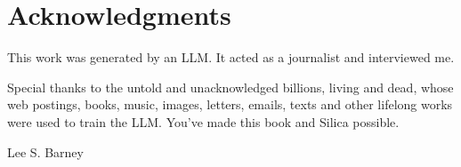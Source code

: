\chapter{Acknowledgments}

\vspace*{\fill}
\begin{center}
\begin{minipage}{0.85\textwidth}
\centering
This work was generated by an LLM. It acted as a journalist and interviewed me.

\medskip
Special thanks to the untold and unacknowledged billions, living and dead,
whose web postings, books, music, images, letters, emails, texts and other
lifelong works were used to train the LLM. You've made this book and Silica
possible.

\bigskip
Lee S. Barney
\end{minipage}
\end{center}
\vspace*{\fill}
\cleardoublepage
